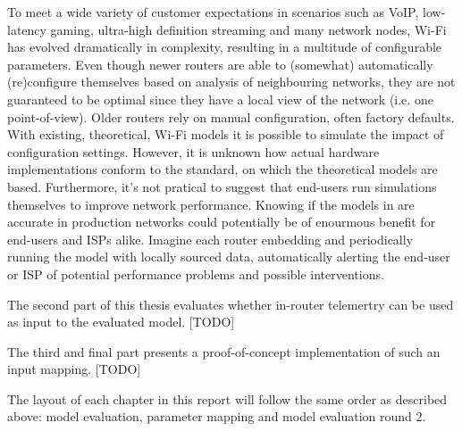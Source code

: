 To meet a wide variety of customer expectations in scenarios such as VoIP,
low-latency gaming, ultra-high definition streaming and many network nodes,
Wi-Fi has evolved dramatically in complexity, resulting in a multitude of
configurable parameters. Even though newer routers are able to (somewhat)
automatically (re)configure themselves based on analysis of neighbouring
networks, they are not guaranteed to be optimal since they have a local view
of the network (i.e. one point-of-view). Older routers rely on manual
configuration, often factory defaults. With existing, theoretical, Wi-Fi
models it is possible to simulate the impact of configuration settings.
However, it is unknown how actual hardware implementations conform to the
standard, on which the theoretical models are based. Furthermore, it's not
pratical to suggest that end-users run simulations themselves to improve
network performance. Knowing if the models in \cite{felemban} are accurate in
production networks could potentially be of enourmous benefit for end-users
and ISPs alike. Imagine each router embedding and periodically running the
model with locally sourced data, automatically alerting the end-user or ISP of
potential performance problems and possible interventions.

The second part of this thesis evaluates whether in-router telemertry can be
used as input to the evaluated model. [TODO]

The third and final part presents a proof-of-concept implementation of such an
input mapping. [TODO]

The layout of each chapter in this report will follow the same order as
described above: model evaluation, parameter mapping and model evaluation
round 2.